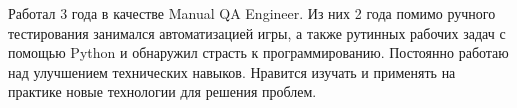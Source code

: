 \documentclass[a4paper, 12pt]{article}
\begin{document}
Работал 3 года в качестве Manual QA Engineer.
Из них 2 года помимо ручного тестирования занимался автоматизацией игры,
а также рутинных рабочих задач с помощью Python и обнаружил страсть к программированию.
Постоянно работаю над улучшением технических навыков.
Нравится изучать и применять на практике новые технологии для  решения проблем.
\end{document}
